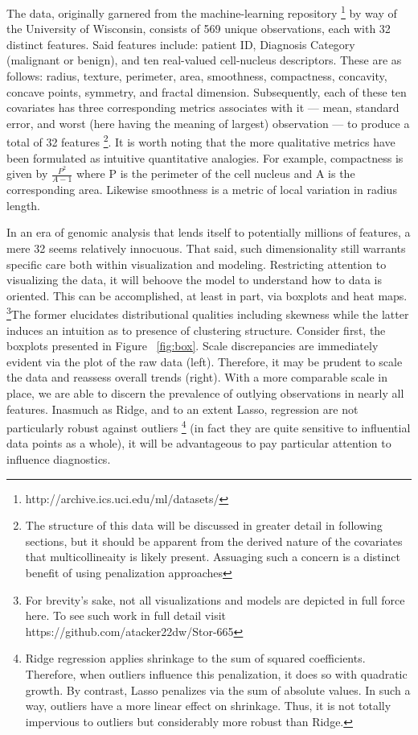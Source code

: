 \documentclass[11pt]{article}
\begin{document}
The data, originally garnered from the machine-learning repository \footnote{http://archive.ics.uci.edu/ml/datasets/} by way of the University of Wisconsin, consists of 569 unique observations, each with 32 distinct features.  Said features include:  patient ID, Diagnosis Category (malignant or benign), and ten real-valued cell-nucleus descriptors.  These are as follows: radius, texture, perimeter, area, smoothness, compactness, concavity, concave points, symmetry, and fractal dimension.  Subsequently, each of these ten covariates has three corresponding metrics associates with it — mean, standard error, and worst (here having the meaning of largest) observation — to produce a total of 32 features \footnote{The structure of this data will be discussed in greater detail in following sections, but it should be apparent from the derived nature of the covariates that multicollineaity is likely present.  Assuaging such a concern is a distinct benefit of using penalization approaches}.  It is worth noting that the more qualitative metrics have been formulated as intuitive quantitative analogies.  For example, compactness is given by $\frac{P^2}{A-1}$ where P is the perimeter of the cell nucleus and A is the corresponding area.  Likewise smoothness is a metric of local variation in radius length.  

	
	In an era of genomic analysis that lends itself to potentially millions of features, a mere 32 seems relatively innocuous.  That said, such dimensionality still warrants specific care both within visualization and modeling.  Restricting attention to visualizing the data, it will behoove the model to understand how to data is oriented.  This can be accomplished, at least in part, via boxplots and heat maps.  \footnote{For brevity's sake, not all visualizations and models are depicted in full force here.  To see such work in full detail visit https://github.com/atacker22dw/Stor-665}The former elucidates distributional qualities including skewness while the latter induces an intuition as to presence of clustering structure.  Consider first, the boxplots presented in Figure 	~\ref{fig:box}.  Scale discrepancies are immediately evident via the plot of the raw data (left).  Therefore, it may be prudent to scale the data and reassess overall trends (right).  With a more comparable scale in place, we are able to discern the prevalence of outlying observations in nearly all features.  Inasmuch as Ridge, and to an extent Lasso, regression are not particularly robust against outliers \footnote {Ridge regression applies shrinkage to the sum of squared coefficients.  Therefore, when outliers influence this penalization, it does so with quadratic growth.  By contrast, Lasso penalizes via the sum of absolute values.  In such a way, outliers have a more linear effect on shrinkage.  Thus, it is not totally impervious to outliers but considerably more robust than Ridge.} (in fact they are quite sensitive to influential data points as a whole), it will be advantageous to pay particular attention to influence diagnostics.  
	
\end{document}

